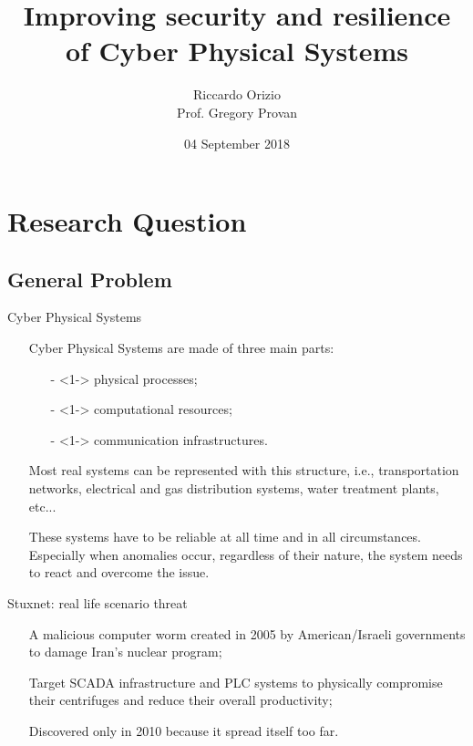 \documentclass{beamer}
\title[Lero Symposium 2018]{Improving security and resilience of Cyber Physical Systems}
\author[Provan G., Orizio R.]{Riccardo Orizio \\ \small{Prof. Gregory Provan}}
\institute[UCC]
{
	Department of Computer Science\\
	\vspace{1mm}
	University College Cork\\
}
\date[2018]{04 September 2018}
\def\itemizespace{\vspace{7mm}}
\begin{document}
\begin{frame}
	\titlepage
\end{frame}



\section{Research Question}

\subsection{General Problem}
\begin{frame}{Cyber Physical Systems}
	\begin{itemize}[<+->]
		\item[] Cyber Physical Systems are made of three main parts:
			\begin{itemize}
				\item[-]<1-> physical processes;
				\item[-]<1-> computational resources;
				\item[-]<1-> communication infrastructures.
			\end{itemize}

		\itemizespace%

		\item[] Most real systems can be represented with this structure, i.e.,
			transportation networks, electrical and gas distribution systems,
			water treatment plants, etc...

		\itemizespace%

		\item[] These systems have to be reliable at all time and in all
			circumstances.
			Especially when anomalies occur, regardless of their nature, the
			system needs to react and overcome the issue.

	\end{itemize}
\end{frame}

\begin{frame}{Stuxnet: real life scenario threat}
	\begin{itemize}[<+->]
		\item[] A malicious computer worm created in 2005 by American/Israeli
			governments to damage Iran's nuclear program;

		\itemizespace%

		\item[] Target SCADA infrastructure and PLC systems to physically
			compromise their centrifuges and reduce their overall productivity;

		\itemizespace%

		\item[] Discovered only in 2010 because it spread itself too far.
	\end{itemize}
\end{frame}
\end{document}
